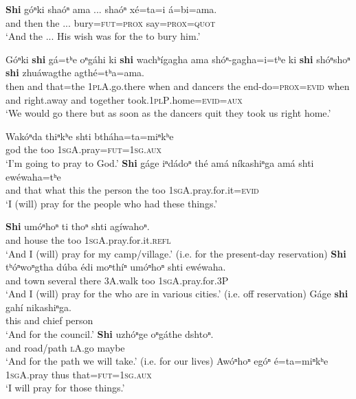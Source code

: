 \documentclass[output=paper]{LSP/langsci}
\begin{document}
\ex\label{ex:rudin:9} 
\gll  \textbf{Shi}  góⁿki 	shaóⁿ 	ama ... shaóⁿ  	xé=ta=i  á=bi=ama.\\          
    	and  	then 	 	the 	 ...   	bury=\textsc{fut=prox} 	say=\textsc{prox=quot}\\
\trans `And the  ...  His wish was for the  to bury him.'

\ex\label{ex:rudin:10} 
\gll  Góⁿki 	\textbf{shi} 	gá=tʰe  oⁿgáhi  ki    \textbf{shi} 	wachʰígagha ama  shóⁿ-gagha=i=tʰe 	ki 	\textbf{shi} 	shóⁿshoⁿ    \textbf{shi} 	zhuáwagthe 	agthé=tʰa=ama.\\
    	then 	and that=the \textsc{1plA}.go.there when 	and dancers the end-do=\textsc{prox=evid} when 	and right.away and 	together 	took.\textsc{1plP}.home=\textsc{evid=aux}\\
\trans `We would go there but as soon as the dancers quit they took us right home.'
\z 

\ea                 \label{ex:rudin:11}
\ea
\gll  Wakóⁿda 	thiⁿkʰe 	shti  	btháha=ta=miⁿkʰe\\
	god          	the       	too  	\textsc{1sgA}.pray=\textsc{fut=1sg.aux}\\
\trans `I'm going to pray to God.'
\ex 
\gll	\textbf{Shi} gáge 	iⁿdádoⁿ thé 	amá 	níkashiⁿga 	amá 	shti ewéwaha=tʰe\\
and 	that   what     	this 	the 	person    	the 	too 	\textsc{1sgA}.pray.for.it=\textsc{evid}\\
\trans `I (will) pray for the people who had these things.'

\ex 
\gll	\textbf{Shi}  umóⁿhoⁿ 	ti    	thoⁿ 	shti 	agíwahoⁿ.\\
and 	  	house 	the 	too 	\textsc{1sgA}.pray.for.it.\textsc{refl}\\
\trans `And I (will) pray for my  camp/village.'  (i.e. for the present-day reservation)
\ex 
\gll	\textbf{Shi} tʰóⁿwoⁿgtha dúba  édi moⁿthíⁿ umóⁿhoⁿ shti ewéwaha. \\         
and town several there 3A.walk   	too 	\textsc{1sgA}.pray.for.3P\\
\trans `And I (will) pray for the  who are in various cities.'  (i.e. off reservation)
\ex 
\gll	Gáge \textbf{shi} 	gahí 	nikashiⁿga.\\
	this 	and 	chief  	person\\
\trans `And for the council.'
\ex 
\gll	\textbf{Shi} uzhóⁿge  	oⁿgáthe 	dshtoⁿ.\\
	and  	road/path 	\textsc{lA}.go  	maybe\\
\trans `And for the path we will take.'  (i.e. for our lives)
\ex 
\gll	Awóⁿhoⁿ 	egóⁿ  	é=ta=miⁿkʰe\\
	\textsc{1sgA}.pray 	thus 	that=\textsc{fut=1sg.aux}\\
\trans `I will pray for those things.' 
\z
\z
\end{document}

